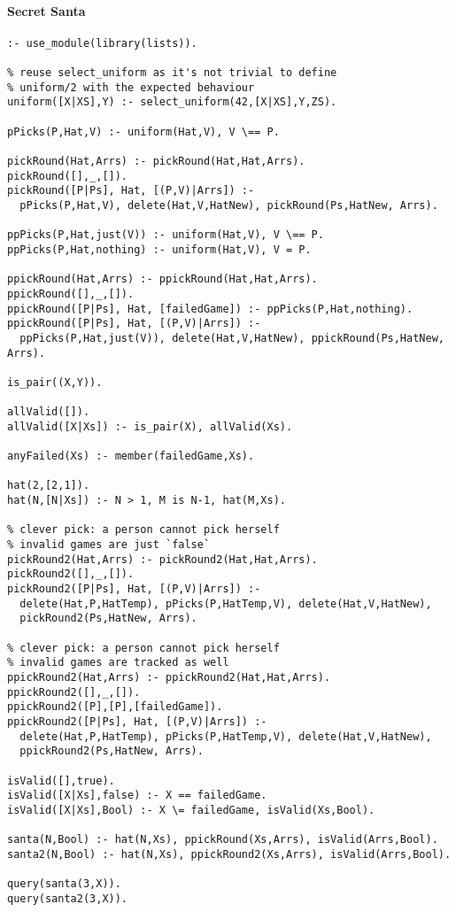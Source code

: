 \paragraph{Secret Santa}
\begin{verbatim}
:- use_module(library(lists)).

% reuse select_uniform as it's not trivial to define
% uniform/2 with the expected behaviour
uniform([X|XS],Y) :- select_uniform(42,[X|XS],Y,ZS).

pPicks(P,Hat,V) :- uniform(Hat,V), V \== P.

pickRound(Hat,Arrs) :- pickRound(Hat,Hat,Arrs).
pickRound([],_,[]).
pickRound([P|Ps], Hat, [(P,V)|Arrs]) :-
  pPicks(P,Hat,V), delete(Hat,V,HatNew), pickRound(Ps,HatNew, Arrs).

ppPicks(P,Hat,just(V)) :- uniform(Hat,V), V \== P.
ppPicks(P,Hat,nothing) :- uniform(Hat,V), V = P.

ppickRound(Hat,Arrs) :- ppickRound(Hat,Hat,Arrs).
ppickRound([],_,[]).
ppickRound([P|Ps], Hat, [failedGame]) :- ppPicks(P,Hat,nothing).
ppickRound([P|Ps], Hat, [(P,V)|Arrs]) :-
  ppPicks(P,Hat,just(V)), delete(Hat,V,HatNew), ppickRound(Ps,HatNew, Arrs).

is_pair((X,Y)).

allValid([]).
allValid([X|Xs]) :- is_pair(X), allValid(Xs).

anyFailed(Xs) :- member(failedGame,Xs).

hat(2,[2,1]).
hat(N,[N|Xs]) :- N > 1, M is N-1, hat(M,Xs).

% clever pick: a person cannot pick herself
% invalid games are just `false`
pickRound2(Hat,Arrs) :- pickRound2(Hat,Hat,Arrs).
pickRound2([],_,[]).
pickRound2([P|Ps], Hat, [(P,V)|Arrs]) :-
  delete(Hat,P,HatTemp), pPicks(P,HatTemp,V), delete(Hat,V,HatNew),
  pickRound2(Ps,HatNew, Arrs).

% clever pick: a person cannot pick herself
% invalid games are tracked as well
ppickRound2(Hat,Arrs) :- ppickRound2(Hat,Hat,Arrs).
ppickRound2([],_,[]).
ppickRound2([P],[P],[failedGame]).
ppickRound2([P|Ps], Hat, [(P,V)|Arrs]) :-
  delete(Hat,P,HatTemp), pPicks(P,HatTemp,V), delete(Hat,V,HatNew),
  ppickRound2(Ps,HatNew, Arrs).

isValid([],true).
isValid([X|Xs],false) :- X == failedGame.
isValid([X|Xs],Bool) :- X \= failedGame, isValid(Xs,Bool).

santa(N,Bool) :- hat(N,Xs), ppickRound(Xs,Arrs), isValid(Arrs,Bool).
santa2(N,Bool) :- hat(N,Xs), ppickRound2(Xs,Arrs), isValid(Arrs,Bool).

query(santa(3,X)).
query(santa2(3,X)).
\end{verbatim}

